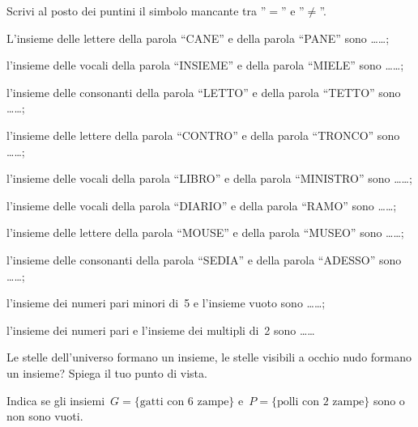 \begin{esercizio}
\label{ese:5.8}
Scrivi al posto dei puntini il simbolo mancante tra ''\(=\)'' e ''\({\neq}\)''.
\begin{enumeratea}
\item L'insieme delle lettere della parola ``CANE'' e della parola ``PANE'' sono 
\ldots\ldots;
\item l'insieme delle vocali della parola ``INSIEME'' e della parola ``MIELE'' 
sono \ldots\ldots;
\item l'insieme delle consonanti della parola ``LETTO'' e della parola ``TETTO'' 
sono \ldots\ldots;
\item l'insieme delle lettere della parola ``CONTRO'' e della parola ``TRONCO'' 
sono \ldots\ldots;
\item l'insieme delle vocali della parola ``LIBRO'' e della parola ``MINISTRO'' 
sono \ldots\ldots;
\item l'insieme delle vocali della parola ``DIARIO'' e della parola ``RAMO'' 
sono \ldots\ldots;
\item l'insieme delle lettere della parola ``MOUSE'' e della parola ``MUSEO'' 
sono \ldots\ldots;
\item l'insieme delle consonanti della parola ``SEDIA'' e della parola 
``ADESSO'' sono \ldots\ldots;
\item l'insieme dei numeri pari minori di~5 e l'insieme vuoto sono \ldots\ldots;
\item l'insieme dei numeri pari e l'insieme dei multipli di~2 sono \ldots\ldots
\end{enumeratea}
\end{esercizio}

\begin{esercizio}
\label{ese:5.9}
Le stelle dell'universo formano un insieme, le stelle visibili a occhio nudo 
formano un insieme? Spiega il tuo punto di vista.
\end{esercizio}


\begin{esercizio}
\label{ese:5.10}
Indica se gli insiemi~\(G =\text{\{gatti con~6 zampe\}}\) e~\(P = \text{\{polli 
con~2 zampe\}}\) sono o non sono vuoti.
\end{esercizio}

